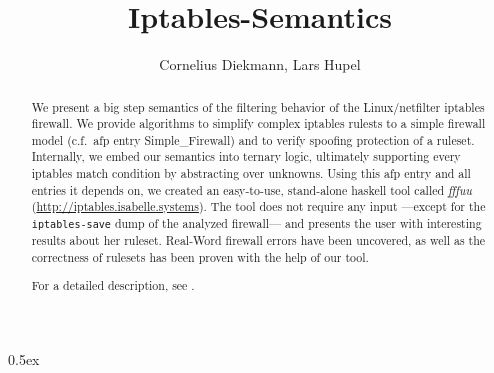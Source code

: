 \documentclass[11pt,a4paper]{article}
\begin{document}
\title{Iptables-Semantics}
\author{Cornelius Diekmann, Lars Hupel}
\maketitle

\begin{abstract}  
  We present a big step semantics of the filtering behavior of the Linux/netfilter iptables firewall. 
  We provide algorithms to simplify complex iptables rulests to a simple firewall model (c.f.\ afp entry Simple\_Firewall) and to verify spoofing protection of a ruleset. 
  Internally, we embed our semantics into ternary logic, ultimately supporting every iptables match condition by abstracting over unknowns. 
  Using this afp entry and all entries it depends on, we created an easy-to-use, stand-alone haskell tool called \emph{fffuu} (\url{http://iptables.isabelle.systems}). 
  The tool does not require any input ---except for the \texttt{iptables-save} dump of the analyzed firewall--- and presents the user with interesting results about her ruleset. 
  Real-Word firewall errors have been uncovered, as well as the correctness of rulesets has been proven with the help of our tool. 
  
For a detailed description, see \cite{diekmann2015fm,diekmann2015cnsm,diekmann2016networking}. 
\end{abstract}

\tableofcontents

\parindent 0pt\parskip 0.5ex





\end{document}
